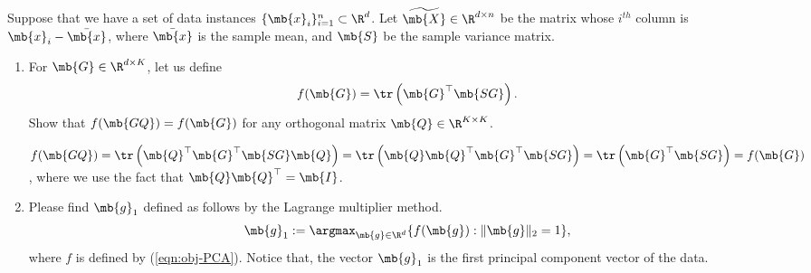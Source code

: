 \begin{exercise}
    Suppose that we have a set of data instances $\{\mb{x}_i\}_{i=1}^n\subset\R^d$. Let $\widetilde{\mb{X}}\in\R^{d\times n}$ be the matrix whose $i^{th}$ column is $\mb{x}_i-\Bar{\mb{x}}$, where $\Bar{\mb{x}}$ is the sample mean, and $\mb{S}$ be the sample variance matrix.

    \begin{enumerate}
        \item For $\mb{G}\in\R^{d\times K}$, let us define
            \begin{align}\label{eqn:obj-PCA}
                f(\mb{G}) = \tr \left(\mb{G}^{\top}\mb{SG}\right).
            \end{align}
            Show that $f(\mb{GQ})=f(\mb{G})$ for any orthogonal matrix $\mb{Q}\in\R^{K\times K}$.

            \begin{solution}
                $f(\mb{GQ}) = \tr \left(\mb{Q}^\top\mb{G}^{\top}\mb{SG}\mb{Q}\right) = \tr \left(\mb{Q}\mb{Q}^\top\mb{G}^{\top}\mb{SG}\right) = \tr \left(\mb{G}^{\top}\mb{SG}\right) = f(\mb{G})$, where we use the fact that $\mb{Q}\mb{Q}^\top=\mb{I}$.
                \qedhere
            \end{solution}

        \item Please find $\mb{g}_1$ defined as follows by the Lagrange multiplier method.
            \begin{align}\label{eqn:PC1}
                \mb{g}_1:=\argmax_{\mb{g}\in\R^d}\{f(\mb{g}):\|\mb{g}\|_2=1\},
            \end{align}
            where $f$ is defined by (\ref{eqn:obj-PCA}). Notice that, the vector $\mb{g}_1$ is the first principal component vector of the data.


\end{enumerate}
\end{exercise}
